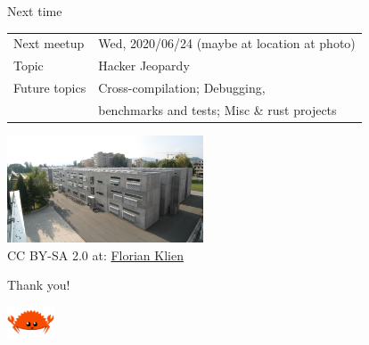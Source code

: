 \documentclass{beamer}
\begin{document}
\begin{frame}[fragile]{Next time}
  \begin{tabular}{ll}
    Next meetup   & Wed, 2020/06/24 (maybe at location at photo) \\
    Topic         & Hacker Jeopardy \\
    Future topics & Cross-compilation; Debugging, \\
                  & benchmarks and tests; Misc \& rust projects
  \end{tabular}
  \vfill{}
  \begin{center}
    \includegraphics[height=120px]{images/inffeldgasse.jpg} \\
    {CC BY-SA 2.0 at: \href{https://en.wikipedia.org/wiki/Graz_University_of_Technology#/media/File:TUG_Inffeldgasse_4.jpg}{Florian Klien}}
  \end{center}
\end{frame}

\begin{frame}[standout]
  Thank you!

  \includegraphics[width=40pt]{images/rustacean-flat-happy.png}
\end{frame}
\end{document}
